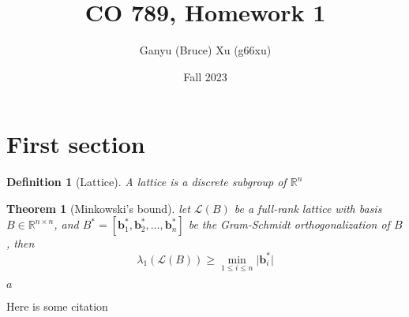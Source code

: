 \documentclass{article}
\title{CO 789, Homework 1}
\author{Ganyu (Bruce) Xu (g66xu)}
\date{Fall 2023}
\newcommand{\norm}[1]{\vert {#1} \vert}
\newtheorem{definition}{Definition}[section]
\newtheorem{theorem}{Theorem}[section]
\begin{document}
\maketitle

\section{First section}
\begin{definition}[Lattice]\label{lattice-def}
A lattice is a discrete subgroup of $\mathbb{R}^n$
\end{definition}

\begin{theorem}[Minkowski's bound]
    let $\mathcal{L}(B)$ be a full-rank lattice with basis $B \in \mathbb{R}^{n \times n}$, and $B^\ast = [\mathbf{b}_1^\ast, \mathbf{b}_2^\ast, \ldots, \mathbf{b}_n^\ast]$ be the Gram-Schmidt orthogonalization of $B$, then
    \begin{equation}
        \lambda_1(\mathcal{L}(B)) \geq \min_{1 \leq i \leq n}\norm{\mathbf{b}_i^\ast}
    \end{equation}
\end{theorem}

\begin{algorithm}
    \SetAlgoLined
    \caption{Euclid's algorithm}
    \Return $a$\;
\end{algorithm}

Here is some citation\cite{fujisaki1999secure}



\end{document}
